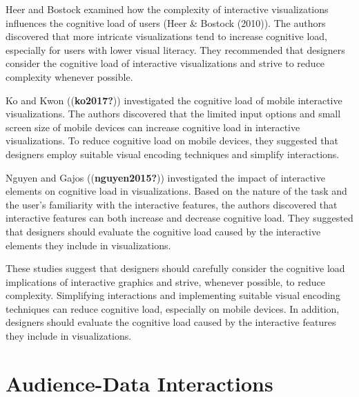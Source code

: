 \documentclass[print]{nuthesis}
\begin{document}
Heer and Bostock examined how the complexity of interactive visualizations influences the cognitive load of users (Heer \& Bostock (2010)).
The authors discovered that more intricate visualizations tend to increase cognitive load, especially for users with lower visual literacy.
They recommended that designers consider the cognitive load of interactive visualizations and strive to reduce complexity whenever possible.

Ko and Kwon ((\textbf{ko2017?})) investigated the cognitive load of mobile interactive visualizations.
The authors discovered that the limited input options and small screen size of mobile devices can increase cognitive load in interactive visualizations.
To reduce cognitive load on mobile devices, they suggested that designers employ suitable visual encoding techniques and simplify interactions.

Nguyen and Gajos ((\textbf{nguyen2015?})) investigated the impact of interactive elements on cognitive load in visualizations.
Based on the nature of the task and the user's familiarity with the interactive features, the authors discovered that interactive features can both increase and decrease cognitive load.
They suggested that designers should evaluate the cognitive load caused by the interactive elements they include in visualizations.

These studies suggest that designers should carefully consider the cognitive load implications of interactive graphics and strive, whenever possible, to reduce complexity.
Simplifying interactions and implementing suitable visual encoding techniques can reduce cognitive load, especially on mobile devices.
In addition, designers should evaluate the cognitive load caused by the interactive features they include in visualizations.

\hypertarget{audience-data-interactions}{%
\section{Audience-Data Interactions}\label{audience-data-interactions}}

\end{document}
